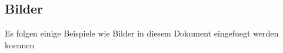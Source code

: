 \documentclass[12pt,a4paper,titlepage,oneside]{scrartcl}
\begin{document}
\subsection{Bilder}

Es folgen einige Beispiele wie Bilder in diesem Dokument eingefuegt werden koennen



%
%
\end{document}
